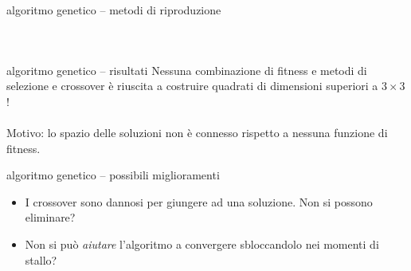 \documentclass[10pt]{beamer}
\begin{document}
\begin{frame}{algoritmo genetico -- metodi di riproduzione}
\begin{columns}[T,onlytextwidth]
\begin{figure}[!htbp]
{
            }\quad
           \end{figure}
	\end{columns}
\end{frame}

\begin{frame}{algoritmo genetico -- risultati}
			\alert{Nessuna} combinazione di fitness e metodi di selezione e crossover è riuscita a costruire quadrati di dimensioni superiori a $ 3\times3 $!
			\\ \hfill \\
			Motivo: lo spazio delle soluzioni non è \alert{connesso} rispetto a nessuna funzione di fitness.
\end{frame}

\begin{frame}{algoritmo genetico -- possibili miglioramenti}
	\begin{itemize}
		\item I crossover sono dannosi per giungere ad una soluzione. Non si possono eliminare?
		\item Non si può \emph{aiutare} l'algoritmo a convergere sbloccandolo nei momenti di stallo?
	\end{itemize}
\end{frame}

\end{document}
